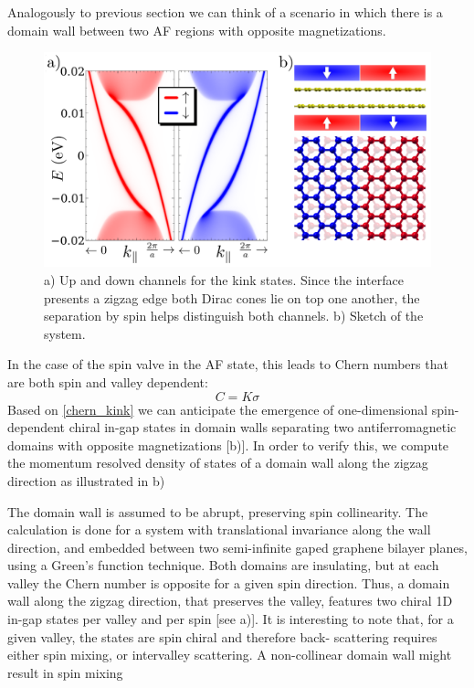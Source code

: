 Analogously to previous section we can think of a scenario in which there is a domain wall between two AF regions with opposite magnetizations.
\begin{figure}[h!]
\centering
\includegraphics{graphene_bilayer/figures/cri3_kink.pdf}
\vspace{-5pt}
\caption{a) Up and down channels for the kink states. Since the interface presents a zigzag edge both Dirac cones lie on top one another, the separation by spin helps distinguish both channels. b) Sketch of the system.}
\label{cri3kink}
\end{figure}




In the case of the spin valve in the AF state, this leads to Chern numbers that are both spin and valley dependent:
\begin{equation}
C=K\sigma
\label{chern_kink}
\end{equation}
Based on \eqref{chern_kink} we can anticipate\cite{Martin2008,San-Jose2009} the emergence of one-dimensional spin-dependent chiral in-gap states in domain walls separating two antiferromagnetic domains with opposite magnetizations [b)]. In order to verify this, we compute the momentum resolved density of states of a domain wall along the zigzag direction as illustrated in b)

The domain wall is assumed to be abrupt, preserving spin collinearity. The calculation is done for a system with translational invariance along the wall direction, and embedded between two semi-infinite gaped graphene bilayer planes, using a Green’s function technique\cite{Lado2015}. Both domains are insulating, but at each valley the Chern number is opposite for a given spin direction. Thus, a domain wall along the zigzag direction, that preserves the valley, features two chiral 1D in-gap states per valley and per spin [see a)]. It is interesting to note that, for a given valley, the states are spin chiral and therefore back- scattering requires either spin mixing, or intervalley scattering. A non-collinear domain wall might result in spin mixing

